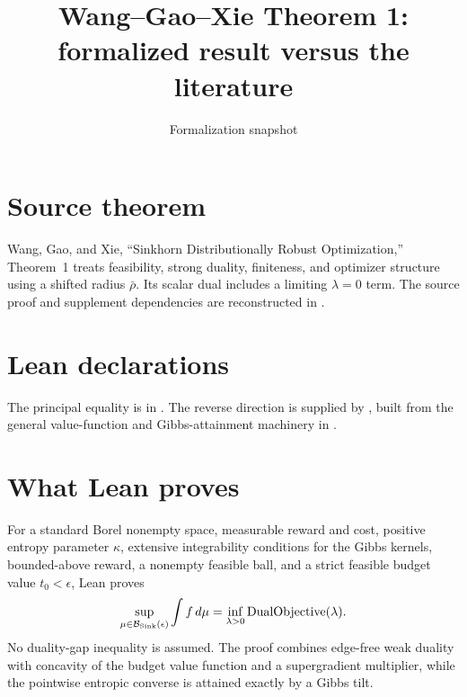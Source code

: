 \title{Wang--Gao--Xie Theorem 1: formalized result versus the literature}
\author{}
\date{Formalization snapshot \snapshot}

\maketitle
{}
\section{Source theorem}
Wang, Gao, and Xie, ``Sinkhorn Distributionally Robust Optimization,'' Theorem~1 treats feasibility, strong duality, finiteness, and optimizer structure using a shifted radius $\bar\rho$.  Its scalar dual includes a limiting $\lambda=0$ term.  The source proof and supplement dependencies are reconstructed in
.

\section{Lean declarations}
The principal equality is  in
.  The reverse direction is supplied by
, built from the general value-function and Gibbs-attainment machinery in .

\section{What Lean proves}
For a standard Borel nonempty space, measurable reward and cost, positive entropy parameter $\kappa$, extensive integrability conditions for the Gibbs kernels, bounded-above reward, a nonempty feasible ball, and a strict feasible budget value $t_0<\epsilon$, Lean proves
\[
 \sup_{\mu\in\mathcal B_{\rm Sink}(\epsilon)}\int f\,d\mu
 =
 \inf_{\lambda>0}\operatorname{DualObjective}(\lambda).
\]
No duality-gap inequality is assumed.  The proof combines edge-free weak duality with concavity of the budget value function and a supergradient multiplier, while the pointwise entropic converse is attained exactly by a Gibbs tilt.

